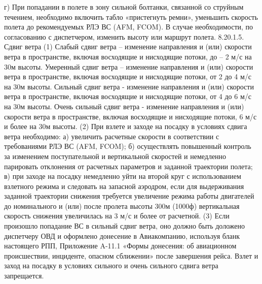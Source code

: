 г)	При попадании в полете в зону сильной болтанки, связанной со струйным течением, необходимо включить табло «пристегнуть ремни», уменьшить скорость полета до рекомендуемых РЛЭ ВС (AFM, FCOM). В случае необходимости, по согласованию с диспетчером, изменить высоту или маршрут полета.
8.20.1.5.	Сдвиг ветра
(1) Слабый сдвиг ветра – изменение направления и (или) скорости ветра в пространстве, включая восходящие и нисходящие потоки, до – 2 м/с на 30м высоты.
Умеренный сдвиг ветра – изменение направления и (или) скорости ветра в пространстве, включая восходящие и нисходящие потоки, от 2 до 4 м/с на 30м высоты.
Сильный сдвиг ветра - изменение направления и (или) скорости ветра в пространстве, включая восходящие и нисходящие потоки, от 4 до 6 м/с на 30м высоты.
Очень сильный сдвиг ветра - изменение направления и (или) скорости ветра в пространстве, включая восходящие и нисходящие потоки, 6 м/с и более на 30м высоты.
(2) При взлете и заходе на посадку в условиях сдвига ветра необходимо:
а)	увеличить расчетные скорости в соответствии с требованиями РЛЭ ВС (AFM, FCOM);
б)	осуществлять повышенный контроль за изменением поступательной и вертикальной скоростей и немедленно парировать отклонения от расчетных параметров и заданной траектории полета;
в)	при заходе на посадку немедленно уйти на второй круг с использованием взлетного режима и следовать на запасной аэродром, если для выдерживания заданной траектории снижения требуется увеличение режима работы двигателей до номинального и (или) после пролета высоты 300м (1000ф) вертикальная скорость снижения увеличилась на 3 м/с и более от расчетной.
(3) Если произошло попадание ВС в сильный сдвиг ветра, оно должно быть доложено диспетчеру ОВД и оформлено донесение в Авиакомпанию, используя бланк настоящего РПП, Приложение A-11.1 «Формы донесения: об авиационном происшествии, инциденте, опасном сближении» после завершения рейса.
Взлет и заход на посадку в условиях сильного и очень сильного сдвига ветра запрещается.

